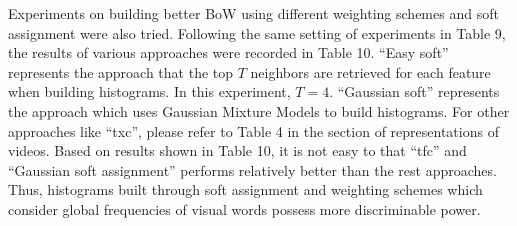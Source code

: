 \begin{table}[!ht]
  \begin{center}
    \end{center}
    \caption{Means and standard deviations (percent) of MAPs over six events using different mechanisms to build histograms}
\end{table}

\noindent Experiments on building better BoW using different weighting schemes and soft assignment were also tried. Following the same setting of experiments in Table 9, the results of various approaches were recorded in Table 10. ``Easy soft'' represents the approach that the top $T$ neighbors are retrieved for each feature when building histograms. In this experiment, $T = 4$. ``Gaussian soft'' represents the approach which uses Gaussian Mixture Models to build histograms. For other approaches like ``txc'', please refer to Table 4 in the section of representations of videos. Based on results shown in Table 10, it is not easy to that ``tfc'' and ``Gaussian soft assignment'' performs relatively better than the rest approaches. Thus, histograms built through soft assignment and weighting schemes which consider global frequencies of visual words possess more discriminable power. \\

